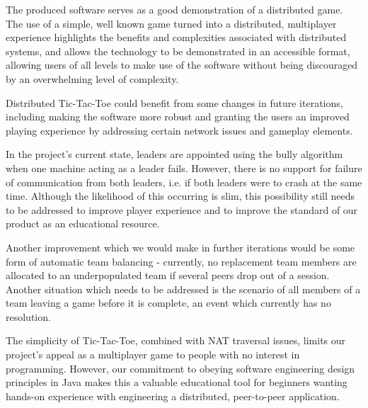 \documentclass[conference]{IEEEtran}
\begin{document}
The produced software serves as a good demonstration of a distributed game. The use of a simple, well known game turned into a distributed, multiplayer experience highlights the benefits and complexities associated with distributed systems, and allows the technology to be demonstrated in an accessible format, allowing users of all levels to make use of the software without being discouraged by an overwhelming level of complexity.

Distributed Tic-Tac-Toe could benefit from some changes in future iterations, including making the software more robust and granting the users an improved playing experience by addressing certain network issues and gameplay elements.

In the project's current state, leaders are appointed using the bully algorithm when one machine acting as a leader fails. However, there is no support for failure of communication from both leaders, i.e. if both leaders were to crash at the same time. Although the likelihood of this occurring is slim, this possibility still needs to be addressed to improve player experience and to improve the standard of our product as an educational resource.

Another improvement which we would make in further iterations would be some form of automatic team balancing - currently, no replacement team members are allocated to an underpopulated team if several peers drop out of a session. Another situation which needs to be addressed is the scenario of all members of a team leaving a game before it is complete, an event which currently has no resolution.

The simplicity of Tic-Tac-Toe, combined with NAT traversal issues, limits our project's appeal as a multiplayer game to people with no interest in programming. However, our commitment to obeying software engineering design principles in Java makes this a valuable educational tool for beginners wanting hands-on experience with engineering a distributed, peer-to-peer application.





\end{document}
